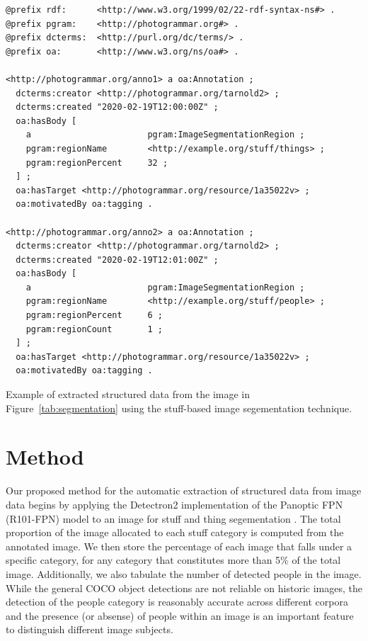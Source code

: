 \documentclass[10pt, a4paper]{article}
\begin{document}
\begin{lstfloat*}[!ht]
\begin{lstlisting}[frame=single]
@prefix rdf:      <http://www.w3.org/1999/02/22-rdf-syntax-ns#> .
@prefix pgram:    <http://photogrammar.org#> .
@prefix dcterms:  <http://purl.org/dc/terms/> .
@prefix oa:       <http://www.w3.org/ns/oa#> .

<http://photogrammar.org/anno1> a oa:Annotation ;
  dcterms:creator <http://photogrammar.org/tarnold2> ;
  dcterms:created "2020-02-19T12:00:00Z" ;
  oa:hasBody [
    a                       pgram:ImageSegmentationRegion ;
    pgram:regionName        <http://example.org/stuff/things> ;
    pgram:regionPercent     32 ;
  ] ;
  oa:hasTarget <http://photogrammar.org/resource/1a35022v> ;
  oa:motivatedBy oa:tagging .

<http://photogrammar.org/anno2> a oa:Annotation ;
  dcterms:creator <http://photogrammar.org/tarnold2> ;
  dcterms:created "2020-02-19T12:01:00Z" ;
  oa:hasBody [
    a                       pgram:ImageSegmentationRegion ;
    pgram:regionName        <http://example.org/stuff/people> ;
    pgram:regionPercent     6 ;
    pgram:regionCount       1 ;
  ] ;
  oa:hasTarget <http://photogrammar.org/resource/1a35022v> ;
  oa:motivatedBy oa:tagging .
\end{lstlisting}
\caption{Example of extracted structured data from the image in
Figure~\ref{tab:segmentation} using the stuff-based image segementation
technique.}
\label{schema}
\end{lstfloat*}

\section{Method} \label{sec:method}

Our proposed method for the automatic extraction of structured data from image
data begins by applying the Detectron2 implementation of the
Panoptic FPN (R101-FPN) model to an image for stuff and thing
segementation \cite{wu2019detectron2}. The total proportion of the image
allocated to each stuff category is computed from the annotated image. We then
store the percentage of each image that falls under a specific category, for
any category that constitutes more than 5\% of the total image. Additionally,
we also tabulate the number of detected people in the image. While the general
COCO object detections are not reliable on historic images, the detection of the
people category is reasonably accurate across different corpora and the presence
(or absense) of people within an image is an important feature to distinguish
different image subjects.
\end{document}
